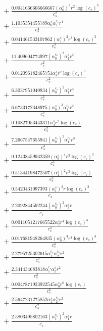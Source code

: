 \documentclass[10pt]{article}
\begin{document}
\begin{align*}
&{}  + \frac{0.0041666666666667 \left(\alpha_{0}^s\right)^{5} r^{2} \log{\left(c_{s} \right)}^{5}}{c_{s}^{2}} \\
&{}  + \frac{1.1035354455789 \alpha_{0}^s \alpha_{1}^{c_s} r^{4}}{c_{s}^{4}} \\
&{}  + \frac{0.041461533107862 \left(\alpha_{1}^s\right)^{2} r^{3} \log{\left(c_{s} \right)}^{3}}{c_{s}^{3}} \\
&{}  + \frac{11.409604774997 \left(\alpha_{0}^{c_s}\right)^{3} \alpha_{1}^s r^{2}}{c_{s}^{2}} \\
&{}  + \frac{0.012096182465751 \alpha_{4}^s r^{2} \log{\left(c_{s} \right)}^{3}}{c_{s}^{2}} \\
&{}  + \frac{6.3037951040834 \left(\alpha_{0}^{c_s}\right)^{2} \alpha_{1}^s r^{3}}{c_{s}^{3}} \\
&{}  + \frac{6.6733172348975 \left(\alpha_{0}^s\right)^{3} \alpha_{1}^{c_s} r^{2}}{c_{s}^{2}} \\
&{}  + \frac{0.10827053443311 \alpha_{4}^s r^{2} \log{\left(c_{s} \right)}}{c_{s}^{2}} \\
&{}  + \frac{7.2667547655941 \left(\alpha_{0}^{c_s}\right)^{2} \alpha_{1}^{c_s} r^{3}}{c_{s}^{3}} \\
&{}  + \frac{0.12438459932359 \left(\alpha_{0}^s\right)^{4} r^{3} \log{\left(c_{s} \right)}^{3}}{c_{s}^{3}} \\
&{}  + \frac{0.51344198472507 \left(\alpha_{1}^s\right)^{2} r^{3} \log{\left(c_{s} \right)}}{c_{s}^{3}} \\
&{}  + \frac{0.5420431097393 \left(\alpha_{1}^s\right)^{3} r \log{\left(c_{s} \right)}^{2}}{c_{s}} \\
&{}  + \frac{2.2092844592244 \left(\alpha_{0}^{c_s}\right)^{2} \alpha_{3}^s r}{c_{s}} \\
&{}  + \frac{0.0011051217665522 \alpha_{2}^s r^{4} \log{\left(c_{s} \right)}^{3}}{c_{s}^{4}} \\
&{}  + \frac{0.017681948264835 \left(\alpha_{0}^s\right)^{3} r^{4} \log{\left(c_{s} \right)}^{3}}{c_{s}^{4}} \\
&{}  + \frac{2.2795725302615 \alpha_{1}^{c_s} \alpha_{2}^{c_s} r^{2}}{c_{s}^{2}} \\
&{}  + \frac{2.341434683818 \alpha_{1}^{c_s} \alpha_{2}^s r^{2}}{c_{s}^{2}} \\
&{}  + \frac{0.0047871923922545 \alpha_{0}^s r^{6} \log{\left(c_{s} \right)}}{c_{s}^{6}} \\
&{}  + \frac{2.5647231275852 \alpha_{1}^s \alpha_{2}^{c_s} r^{2}}{c_{s}^{2}} \\
&{}  + \frac{2.5803495802163 \left(\alpha_{1}^{c_s}\right)^{2} \alpha_{1}^s r}{c_{s}} \\

\end{align*}
\end{document}

